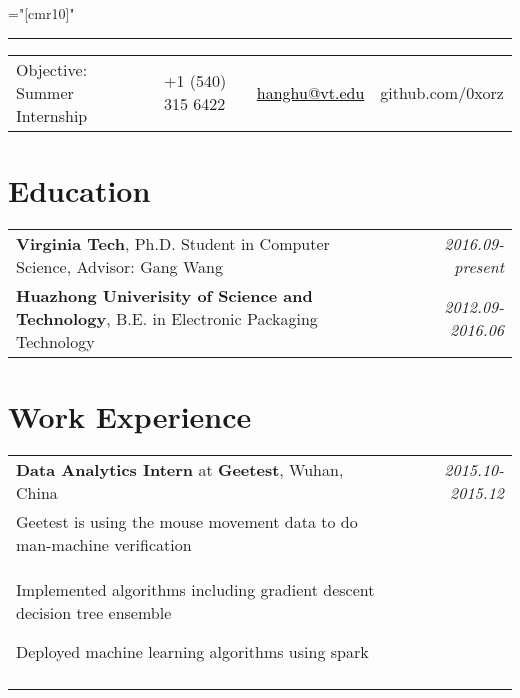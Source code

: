\documentclass[a4paper,10pt]{article}
\begin{document}
\pagestyle{empty} %

\font\fb="[cmr10]" %
\bigskip

\hrule height 0.7mm \vspace{-0.4em}
\begin{tabular}{p{4.5cm}p{2.8cm}p{3.0cm}p{3.0cm}}
 {\small Objective: Summer Internship}
& {\small +1 (540) 315 6422}
& {\small \href{mailto:hanghu@vt.edu}{\textcolor{black}{hanghu@vt.edu}}}
&{\small github.com/0xorz}
   \\
\end{tabular}
\section{Education}
\begin{tabular}{p{14cm}p{0cm}r}
\textbf{Virginia Tech}, Ph.D. Student in Computer Science, Advisor: Gang Wang && \emph{2016.09-present} \\
\textbf{Huazhong Univerisity of Science and Technology}, B.E. in Electronic Packaging Technology && \emph{2012.09-2016.06} \\
\end{tabular}

\section{Work Experience}
\begin{tabular}{p{13.5cm}p{0.5cm}r}

\textbf{Data Analytics Intern} at \textbf{Geetest}, Wuhan, China && \emph{2015.10-2015.12} \\
\hspace{1em} Geetest is using the mouse movement data to do man-machine verification&& \vspace{0em} \\
\begin{compactitem}
  \item Implemented algorithms including gradient descent decision tree ensemble\vspace{0.2em}
  \item Deployed machine learning algorithms using spark\vspace{0.2em}
\end{compactitem}&&\vspace{-2.2em} \\
\multicolumn{3}{c}{} \\

\end{tabular}
\end{document}
